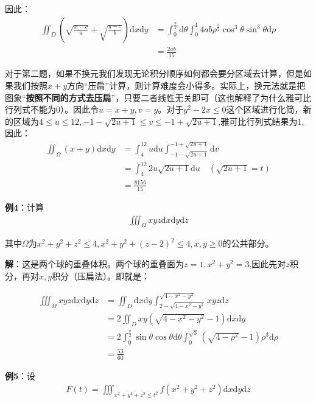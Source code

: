 \documentclass{ctexart}
\let\oldtextbf\textbf
\renewcommand{\textbf}[1]{\textcolor{brown!50!red}{\oldtextbf{#1}}}
\begin{document}
因此：
\begin{align*} 
\iint_D\left(\sqrt{\frac{x-c}{a}}+\sqrt{\frac{y-c}{b}}\right)\mathrm{d}x\mathrm{d}y
&=\int_0^{\frac{\pi}{2}}\mathrm{d}\theta\int_0^1  4ab\rho^{\frac{3}{2}}\cos^3\theta\sin^3\theta
\mathrm{d}\rho\\
&=\frac{2ab}{15}  
\end{align*}

对于第二题，如果不换元我们发现无论积分顺序如何都会要分区域去计算，但是如果我们按照$x+y$方向“压扁”计算，则计算难度会小得多。实际上，换元法就是把图象“\textbf{\color{brown!50!red}按照不同的方式去压扁}”，只要二者线性无关即可（这也解释了为什么雅可比行列式不能为0）。因此令$u=x+y,v=y$。对于$y^2-2x\leq 0$这个区域进行化简，新的区域为$4\leq u\leq 12,-1-\sqrt{2u+1}\leq v\leq -1+\sqrt{2u+1}$,雅可比行列式结果为1,因此：
\begin{align*} 
\iint_\Omega(x+y)\mathrm{d}x\mathrm{d}y&=\int_4^{12}u\mathrm{d}u\int_{-1-\sqrt{2u+1}}  
^{-1+\sqrt{2u+1}}\mathrm{d}v\\
&=\int_4^{12} 2u\sqrt{2u+1}\mathrm{d}u\quad (\sqrt{2u+1}=t)\\
&=\frac{8156}{15}    
\end{align*}

\textbf{\color{brown!50!red}例4}：计算
\begin{align*} 
\iiint_\Omega xyz\mathrm{d}x\mathrm{d}y\mathrm{d}z
\end{align*}

其中$\Omega$为$x^2+y^2+z^2\leq 4,x^2+y^2+(z-2)^2\leq 4,x,y\geq 0$的公共部分。

\textbf{\color{brown!50!red}解}：这是两个球的重叠体积。两个球的重叠面为$z=1,x^2+y^2=3$,因此先对$z$积分，再对$x,y$积分（压扁法）。即就是：

\begin{align*} 
\iiint_\Omega xyz\mathrm{d}x\mathrm{d}y\mathrm{d}z &=\iint_D\mathrm{d}x\mathrm{d}y\int
_{2-\sqrt{4-x^2-y^2}}^{\sqrt{4-x^2-y^2}} xyz\mathrm{d}z\\
&=2\iint_D xy(\sqrt{4-x^2-y^2}-1) \mathrm{d}x\mathrm{d}y\\
&=2\int_0^{\frac{\pi}{2}}\sin\theta\cos\theta\mathrm{d}\theta\int_0^{\sqrt{3}}(\sqrt{4-\rho^2}-1)\rho^3\mathrm{d}\rho\\
&=\frac{53}{60} 
\end{align*}

\textbf{\color{brown!50!red}例5}：设
\begin{align*} 
F(t)=\iiint_{x^2+y^2+z^2\leq t^2}f(x^2+y^2+z^2)\mathrm{d}x\mathrm{d}y\mathrm{d}z  
\end{align*}
\end{document}
